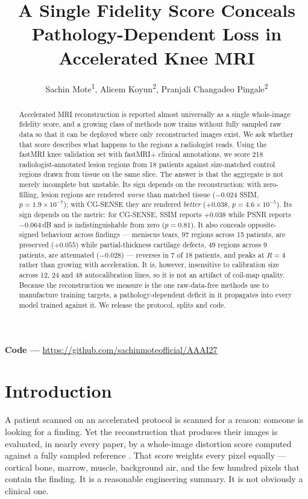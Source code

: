 \documentclass[letterpaper]{article} %
\title{A Single Fidelity Score Conceals Pathology-Dependent Loss in\\Accelerated Knee MRI}
\author{
    Sachin Mote\textsuperscript{\rm 1},
    Alicem Koyun\textsuperscript{\rm 2},
    Pranjali Changadeo Pingale\textsuperscript{\rm 2}
}
\begin{document}
\maketitle

\begin{abstract}
Accelerated MRI reconstruction is reported almost universally as a single
whole-image fidelity score, and a growing class of methods now trains without
fully sampled raw data so that it can be deployed where only reconstructed
images exist. We ask whether that score describes what happens to the regions a
radiologist reads. Using the fastMRI knee validation set with fastMRI+ clinical
annotations, we score 218 radiologist-annotated lesion regions from 18 patients
against size-matched control regions drawn from tissue on the same slice. The
answer is that the aggregate is not merely incomplete but unstable. Its sign
depends on the reconstruction: with zero-filling, lesion regions are rendered
\emph{worse} than matched tissue ($-0.024$ SSIM, $p{=}1.9\times10^{-7}$); with
CG-SENSE they are rendered \emph{better} ($+0.038$, $p{=}4.6\times10^{-5}$). Its
sign depends on the metric: for CG-SENSE, SSIM reports $+0.038$ while PSNR
reports $-0.064$\,dB and is indistinguishable from zero ($p{=}0.81$). It also
conceals opposite-signed behaviour across findings --- meniscus tears, 97
regions across 15 patients, are preserved ($+0.055$) while partial-thickness
cartilage defects, 49 regions across 9 patients, are attenuated ($-0.028$) ---
reverses in 7 of 18 patients, and peaks at $R{=}4$ rather than growing with
acceleration. It is, however, insensitive to calibration size across 12, 24 and
48 autocalibration lines, so it is not an artifact of coil-map quality. Because
the reconstruction we measure is the one raw-data-free methods use to
manufacture training targets, a pathology-dependent deficit in it propagates
into every model trained against it. We release the protocol, splits and code.
\end{abstract}

\noindent\textbf{Code ---} \url{https://github.com/sachinmoteofficial/AAAI27}

\section{Introduction}

A patient scanned on an accelerated protocol is scanned for a reason: someone is
looking for a finding. Yet the reconstruction that produces their images is
evaluated, in nearly every paper, by a whole-image distortion score computed
against a fully sampled reference \citep{zbontar2018fastmri}. That score weights
every pixel equally --- cortical bone, marrow, muscle, background air, and the
few hundred pixels that contain the finding. It is a reasonable engineering
summary. It is not obviously a clinical one.
\end{document}
